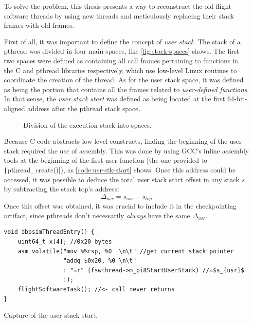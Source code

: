 To solve the problem, this thesis presents a way to reconstruct the old flight software threads by using new threads and meticulously replacing their stack frames with old frames. 

First of all, it was important to define the concept of \textit{user stack}. The stack of a pthread was divided in four main spaces, like \autoref{fig:stack-spaces} shows. The first two spaces were defined as containing all call frames pertaining to functions in the C and pthread libraries respectively, which use low-level Linux routines to coordinate the creation of the thread. As for the user stack space, it was defined as being the portion that contains all the frames related to \textit{user-defined functions}. In that sense, the \textit{user stack start} was defined as being located at the first 64-bit-aligned address after the pthread stack space. 
\begin{figure}[htbp]
	\centering 
	
	\caption{Division of the execution stack into spaces.}
	\label{fig:stack-spaces}
\end{figure}

Because C code abstracts low-level constructs, finding the beginning of the user stack required the use of assembly. This was done by using \gls{GCC}'s inline assembly tools at the beginning of the first user function (the one provided to \texttt|pthread_create()|), as \autoref{code:usr-stk-start} shows\cite{online:inline-asm}. Once this address could be accessed, it was possible to deduce the total user stack start offset in any stack $s$ by subtracting the stack top's address:
\[
	\Delta_{usr}=s_{usr}-s_{top}
\]
Once this offset was obtained, it was crucial to include it in the checkpointing artifact, since pthreads don't necessarily \textit{always} have the same $\Delta_{usr}$. 
\begin{listing}[htpb]
	\centering
	\begin{verbatim}
void bbpsimThreadEntry() {
	uint64_t x[4]; //0x20 bytes 
	asm volatile("mov %%rsp, %0  \n\t" //get current stack pointer
                 "addq $0x20, %0 \n\t" 
                 : "=r" (fswthread->m_pi8StartUserStack) //=$s_{usr}$
                 :);
	flightSoftwareTask(); //<- call never returns
}
	\end{verbatim}
	\caption{Capture of the user stack start.}
	\label{code:usr-stk-start}
\end{listing}

